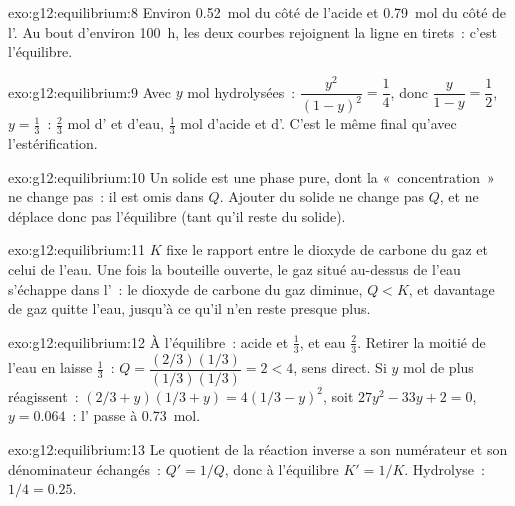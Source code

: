 \begin{solution}{exo:g12:equilibrium:8}
Environ \qty{0.52}{mol} du côté de l'acide et \qty{0.79}{mol} du côté de
l'. Au bout d'environ \qty{100}{h}, les deux courbes rejoignent la
ligne en tirets~: c'est l'équilibre.
\end{solution}

\begin{solution}{exo:g12:equilibrium:9}
Avec $y$ mol hydrolysées~: $\dfrac{y^2}{(1-y)^2} = \dfrac{1}{4}$, donc
$\dfrac{y}{1-y} = \dfrac{1}{2}$, $y = \frac{1}{3}$~: $\frac{2}{3}$ mol
d' et d'eau, $\frac{1}{3}$ mol d'acide et d'. C'est le même
 final qu'avec l'estérification.
\end{solution}

\begin{solution}{exo:g12:equilibrium:10}
Un solide est une phase pure, dont la «~concentration~» ne change pas~:
il est omis dans $Q$. Ajouter du solide ne change pas $Q$, et ne déplace
donc pas l'équilibre (tant qu'il reste du solide).
\end{solution}

\begin{solution}{exo:g12:equilibrium:11}
$K$ fixe le rapport entre le dioxyde de carbone du gaz et celui de
l'eau. Une fois la bouteille ouverte, le gaz situé au-dessus de l'eau
s'échappe dans l'~: le dioxyde de carbone du gaz diminue, $Q < K$, et
davantage de gaz quitte l'eau, jusqu'à ce qu'il n'en reste presque plus.
\end{solution}

\begin{solution}{exo:g12:equilibrium:12}
À l'équilibre~: acide et  $\frac{1}{3}$,  et eau
$\frac{2}{3}$. Retirer la moitié de l'eau en laisse $\frac{1}{3}$~:
$Q = \dfrac{(2/3)(1/3)}{(1/3)(1/3)} = 2 < 4$, sens direct. Si $y$ mol
de plus réagissent~: $(2/3 + y)(1/3 + y) = 4(1/3 - y)^2$, soit
$27y^2 - 33y + 2 = 0$, $y = 0.064$~: l' passe à \qty{0.73}{mol}.
\end{solution}

\begin{solution}{exo:g12:equilibrium:13}
Le quotient de la réaction inverse a son numérateur et son dénominateur
échangés~: $Q' = 1/Q$, donc à l'équilibre $K' = 1/K$. Hydrolyse~:
$1/4 = 0.25$.
\end{solution}

